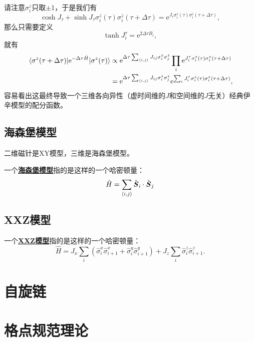 \documentclass[hyperref, UTF8, a4paper]{ctexart}
\newcommand*{\ee}{\mathrm{e}}
\newcommand*{\pair}[1]{\langle #1 \rangle}
\newcommand*{\concept}[1]{\underline{\textbf{#1}}}
\begin{document}
请注意$\sigma_i^z$只取$\pm 1$，于是我们有
\[
    \cosh J_\tau + \sinh J_\tau \sigma^z_i(\tau) \sigma^z_i(\tau + \Delta \tau) = \ee^{J_\tau \sigma^z_i(\tau) \sigma^z_i(\tau + \Delta \tau)},
\]
那么只需要定义
\begin{equation}
    \tanh J^\tau_i = \ee^{2 \Delta \tau B_i}, 
\end{equation}
就有
\[
    \begin{aligned}
        \mel{\sigma^z(\tau + \Delta \tau)}{\ee^{-\Delta \tau \hat{H}}}{\sigma^z(\tau)} &\propto \ee^{\Delta \tau \sum_{\pair{i, j}} J_{ij} \sigma_i^z \sigma_j^z} \prod_i \ee^{J_i^\tau \sigma_i^z(\tau) \sigma_i^z(\tau + \Delta \tau)} \\
        &= \ee^{\Delta \tau \sum_{\pair{i, j}} J_{ij} \sigma_i^z \sigma_j^z} \ee^{\sum_i J_i^\tau \sigma_i^z(\tau) \sigma_i^z(\tau + \Delta \tau)},
    \end{aligned}
\]
容易看出这最终导致一个三维各向异性（虚时间维的$J$和空间维的$J$无关）经典伊辛模型的配分函数。

\subsection{海森堡模型}

二维磁针是XY模型，三维是海森堡模型。

一个\concept{海森堡模型}指的是这样的一个哈密顿量：
\begin{equation}
    \hat{H} = \sum_{\pair{i, j}} \hat{\vb*{S}}_i \cdot \hat{\vb*{S}}_j
\end{equation}

\subsection{XXZ模型}

一个\concept{XXZ模型}指的是这样的一个哈密顿量：
\begin{equation}
    \hat{H} = J_x \sum_i (\hat{\sigma}_{i}^x \hat{\sigma}_{i+1}^x + \hat{\sigma}_{i}^y \hat{\sigma}_{i+1}^y) + J_z \sum_{i} \hat{\sigma}_i^z \hat{\sigma}_{i+1}^z.
\end{equation}

\section{自旋链}

\section{格点规范理论}
\end{document}
